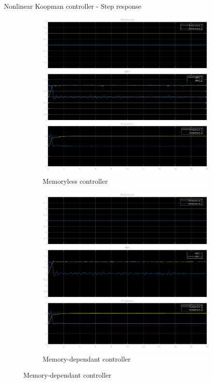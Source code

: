\documentclass{beamer}
\begin{document}
\begin{frame}{Nonlinear Koopman controller - Step response}
    \begin{figure}
        \centering
        \begin{subfigure}[b]{0.45\textwidth}
            \centering
            \includegraphics[width=\textwidth]{Undelayed_Koopman_Step.png}
            \caption{Memoryless controller}
        \end{subfigure}
        \hfill
        \begin{subfigure}[b]{0.45\textwidth}
            \centering
            \includegraphics[width=\textwidth]{Delayed_Koopman_Step.png}
            \caption{Memory-dependant controller}
        \end{subfigure}
    \end{figure}
\end{frame}
\end{document}
